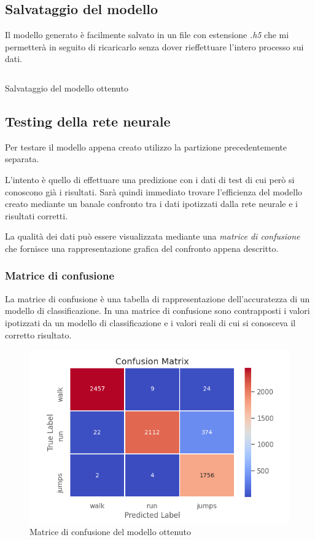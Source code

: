 \subsection{Salvataggio del modello}
Il modello generato è facilmente salvato in un file con estensione \textit{.h5} che mi permetterà in seguito 
di ricaricarlo senza dover rieffettuare l'intero processo sui dati.
\begin{listing}[H] 
    \inputminted[frame=single,framesep=10pt]{python}{assets/snippets/classifier/save_model.py}
    \caption{Salvataggio del modello ottenuto}
\end{listing}


\subsection{Testing della rete neurale}
Per testare il modello appena creato utilizzo la partizione precedentemente separata.

L'intento è quello di effettuare una predizione con i dati di test di cui però si conoscono già i risultati. 
Sarà quindi immediato trovare l'efficienza del modello creato mediante un banale confronto tra i dati ipotizzati 
dalla rete neurale e i risultati corretti.

La qualità dei dati può essere visualizzata mediante una \textit{matrice di confusione} che fornisce una rappresentazione 
grafica del confronto appena descritto.

\subsubsection{Matrice di confusione}
La matrice di confusione è una tabella di rappresentazione dell'accuratezza di un modello di classificazione. 
In una matrice di confusione sono contrapposti i valori ipotizzati da un modello di classificazione e i valori reali 
di cui si conosceva il corretto risultato.

\begin{figure}[H]
    \centering
    \includegraphics[scale = 0.80]{assets/images/classifications/accelerometer/right_hand/confusion-matrix-right-hand-acc.png}
    \caption{Matrice di confusione del modello ottenuto}
\end{figure}



